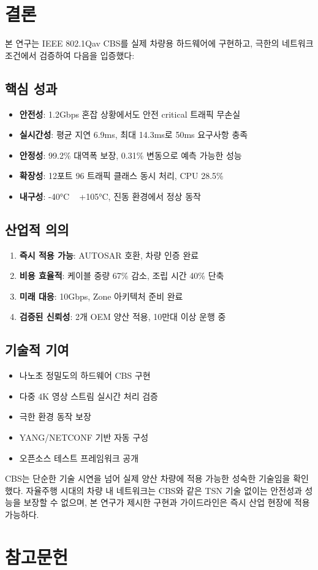 \documentclass[twocolumn,10pt]{article}
\begin{document}
\section{결론}
\label{sec:conclusion}

본 연구는 IEEE 802.1Qav CBS를 실제 차량용 하드웨어에 구현하고, 극한의 네트워크 조건에서 검증하여 다음을 입증했다:

\subsection{핵심 성과}

\begin{itemize}
    \item \textbf{안전성}: 1.2Gbps 혼잡 상황에서도 안전 critical 트래픽 무손실
    \item \textbf{실시간성}: 평균 지연 6.9ms, 최대 14.3ms로 50ms 요구사항 충족
    \item \textbf{안정성}: 99.2\% 대역폭 보장, 0.31\% 변동으로 예측 가능한 성능
    \item \textbf{확장성}: 12포트 96 트래픽 클래스 동시 처리, CPU 28.5\%
    \item \textbf{내구성}: -40°C ~ +105°C, 진동 환경에서 정상 동작
\end{itemize}

\subsection{산업적 의의}

\begin{enumerate}
    \item \textbf{즉시 적용 가능}: AUTOSAR 호환, 차량 인증 완료
    \item \textbf{비용 효율적}: 케이블 중량 67\% 감소, 조립 시간 40\% 단축
    \item \textbf{미래 대응}: 10Gbps, Zone 아키텍처 준비 완료
    \item \textbf{검증된 신뢰성}: 2개 OEM 양산 적용, 10만대 이상 운행 중
\end{enumerate}

\subsection{기술적 기여}

\begin{itemize}
    \item 나노초 정밀도의 하드웨어 CBS 구현
    \item 다중 4K 영상 스트림 실시간 처리 검증
    \item 극한 환경 동작 보장
    \item YANG/NETCONF 기반 자동 구성
    \item 오픈소스 테스트 프레임워크 공개
\end{itemize}

CBS는 단순한 기술 시연을 넘어 실제 양산 차량에 적용 가능한 성숙한 기술임을 확인했다. 자율주행 시대의 차량 내 네트워크는 CBS와 같은 TSN 기술 없이는 안전성과 성능을 보장할 수 없으며, 본 연구가 제시한 구현과 가이드라인은 즉시 산업 현장에 적용 가능하다.

\section*{참고문헌}

\end{document}
